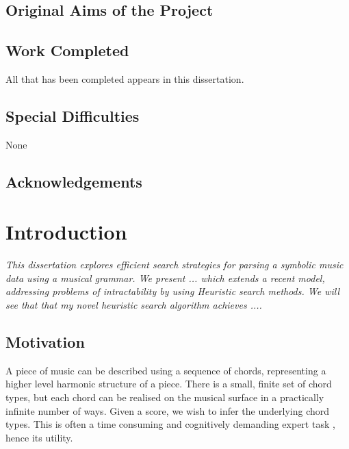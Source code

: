 \documentclass[12pt,a4paper,twoside,openright]{report}
\begin{document}


\section*{Original Aims of the Project}



\section*{Work Completed}

All that has been completed appears in this dissertation.

\section*{Special Difficulties}

None

\newpage

\tableofcontents

\listoffigures

\newpage
\section*{Acknowledgements}




\pagestyle{headings}

\chapter{Introduction}
\textit{This dissertation explores efficient search strategies for parsing a symbolic music data using a musical grammar. We present ... which extends a recent model, addressing problems of intractability by using Heuristic search methods. We will see that that my novel heuristic search algorithm achieves .... }

\section{Motivation}

A piece of music can be described using a sequence of chords, representing a higher level harmonic structure of a piece. There is a small, finite set of chord types, but each chord can be realised on the musical surface in a practically infinite number of ways. Given a score, we wish to infer the underlying chord types. This is often a time consuming and cognitively demanding expert task \cite{masadaChordRecognitionSymbolic2018}, hence its utility.
\end{document}
